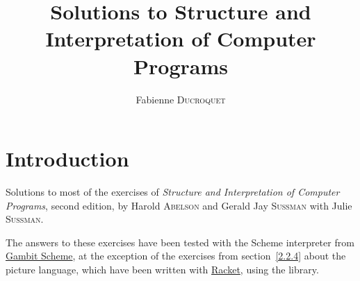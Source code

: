 \documentclass{scrreprt}
\title{Solutions to Structure and Interpretation of Computer Programs}
\author{Fabienne \textsc{Ducroquet}}
\newcounter{mitpage}
\let\oldchapter\chapter
\renewcommand\chapter{\stepcounter{mitpage}\oldchapter}
\theoremstyle{example}
\theoremstyle{remark}
\theoremstyle{comp}
\theoremstyle{sicp-exe}
\begin{document}
\maketitle


\clearpage
{}
\tableofcontents

\chapter*{Introduction}

Solutions to most of the exercises of \emph{Structure and Interpretation of 
Computer Programs}, second edition, by Harold \textsc{Abelson} and Gerald Jay 
\textsc{Sussman} with Julie \textsc{Sussman}.

The answers to these exercises have been tested with the Scheme interpreter from 
\href{http://gambitscheme.org}{Gambit Scheme}, at the exception of the exercises 
from section~\ref{2.2.4} about the picture language, which have been written 
with \href{http://racket-lang.org}{Racket}, using the  
library.






\end{document}
